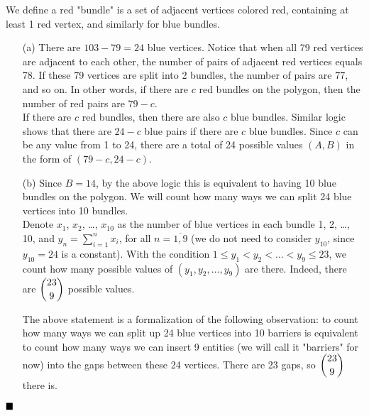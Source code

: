 \documentclass[11pt]{article}
\newenvironment{solution}[1][Solution]{%
  \proof[\normalfont \faPenNib \hspace{0.2cm} \ttfamily \scshape \large #1]%
}{\(\hfill \blacksquare\){\parfillskip0pt\par}}
\theoremstyle{definition}
\begin{document}
        \begin{solution}
            We define a red "bundle" is a set of adjacent vertices colored red, containing at least 1 red vertex, and similarly for blue bundles.
            \begin{enumerate}
                \item[(a)] There are \(103 - 79 = 24\) blue vertices. Notice that when all 79 red vertices are adjacent to each other, the number of pairs of adjacent red vertices equals 78. If these 79 vertices are split into 2 bundles, the number of pairs are 77, and so on. In other words, if there are \(c\) red bundles on the polygon, then the number of red pairs are \(79 - c\).\\
                If there are \(c\) red bundles, then there are also \(c\) blue bundles. Similar logic shows that there are \(24 - c\) blue pairs if there are \(c\) blue bundles. Since \(c\) can be any value from 1 to 24, there are a total of 24 possible values \((A,B)\) in the form of \((79 - c, 24 - c)\).

                \item[(b)] Since \(B = 14\), by the above logic this is equivalent to having 10 blue bundles on the polygon. We will count how many ways we can split 24 blue vertices into 10 bundles.\\
                Denote \(x_1\), \(x_2\), \dots, \(x_{10}\) as the number of blue vertices in each bundle 1, 2, \dots, 10, and \(y_n = \sum\limits_{i=1}^n x_i\), for all \(n = \overline{1,9}\) (we do not need to consider \(y_{10}\), since \(y_{10} = 24\) is a constant). With the condition \(1 \leq y_1 < y_2 < \dots < y_9 \leq 23\), we count how many possible values of \((y_1, y_2, \dots, y_9)\) are there. Indeed, there are \(\dbinom{23}{9}\) possible values.

                \begin{motivation}
                    The above statement is a formalization of the following observation: to count how many ways we can split up 24 blue vertices into 10 barriers is equivalent to count how many ways we can insert 9 entities (we will call it "barriers" for now) into the gaps between these 24 vertices. There are 23 gaps, so \(\dbinom{23}{9}\) there is.
                \end{motivation}


\end{enumerate}
\end{solution}
\end{document}
